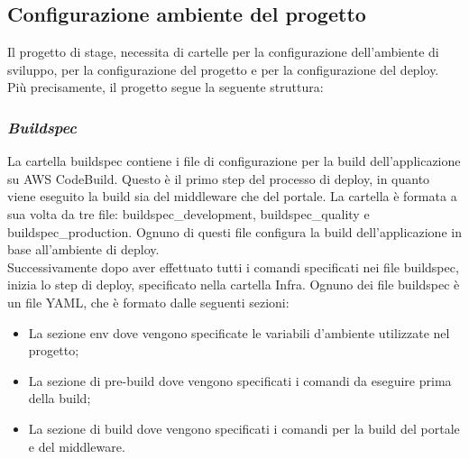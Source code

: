 \subsection{Configurazione ambiente del progetto}
Il progetto di stage, necessita di cartelle per la configurazione dell'ambiente di sviluppo, per la configurazione del progetto e per la configurazione del deploy.
Più precisamente, il progetto segue la seguente struttura:

\subsubsection*{\emph{Buildspec}}
La cartella buildspec contiene i file di configurazione per la build dell'applicazione su AWS CodeBuild.
Questo è il primo step del processo di deploy, in quanto viene eseguito la build sia del middleware che del portale.
La cartella è formata a sua volta da tre file: buildspec\_development, buildspec\_quality e buildspec\_production. 
Ognuno di questi file configura la build dell'applicazione in base all'ambiente di deploy.\\
Successivamente dopo aver effettuato tutti i comandi specificati nei file buildspec, inizia lo step di deploy, specificato nella cartella Infra.
Ognuno dei file buildspec è un file YAML, che è formato dalle seguenti sezioni:
\begin{itemize}
  \item La sezione env dove vengono specificate le variabili d'ambiente utilizzate nel progetto;
  \item La sezione di pre-build dove vengono specificati i comandi da eseguire prima della build;
  \item La sezione di build dove vengono specificati i comandi per la build del portale e del middleware.
\end{itemize}

